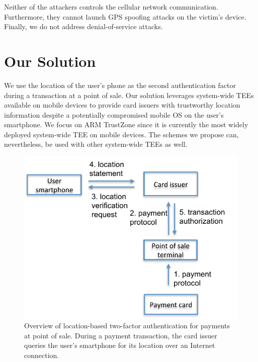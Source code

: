 Neither of the attackers controls the cellular network
communication. Furthermore, they cannot launch GPS spoofing attacks on the
victim's device. Finally, we do not address denial-of-service attacks.

\section{Our Solution}
\label{sec:ps_tee_architecture}

We use the location of the user's phone as the second authentication factor
during a transaction at a point of sale.  Our solution leverages system-wide
TEEs available on mobile devices to provide card issuers with trustworthy
location information despite a potentially compromised mobile OS on the user's
smartphone.  We focus on ARM TrustZone since it is currently the most widely
deployed system-wide TEE on mobile devices.  The schemes we propose can,
nevertheless, be used with other system-wide TEEs as well.

\begin{figure}[!ht]
    \centering
    \includegraphics[width=.8\linewidth]{figures/phonesecures/tee_overview}
    \caption[Overview of location-based two-factor authentication for
      payments at point of sale]{Overview of location-based two-factor authentication for payments at point of sale. During a payment transaction, the card issuer
      queries the user's smartphone for its location over an Internet
      connection.}
    \label{fig:ps_tee_overview}
\end{figure}

